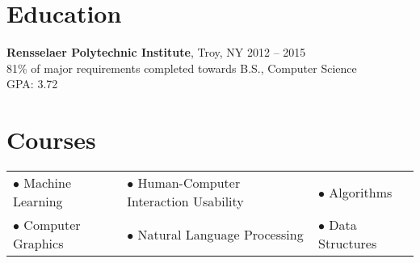 \documentclass[margin]{res}
\begin{document}
\begin{minipage}{\textwidth}
\begin{resume}
\section{Education}
{\bf Rensselaer Polytechnic Institute}, Troy, NY \hfill 2012 -- 2015 \\
81\% of major requirements completed towards B.S., Computer Science \\
GPA: 3.72

\section{Courses}
\begin{tabular}{lll}
$\bullet$ Machine Learning & $\bullet$ Human-Computer Interaction Usability & $\bullet$ Algorithms \\
$\bullet$ Computer Graphics & $\bullet$ Natural Language Processing & $\bullet$ Data Structures \\
\end{tabular}

\end{resume}
\end{minipage}
\end{document}
